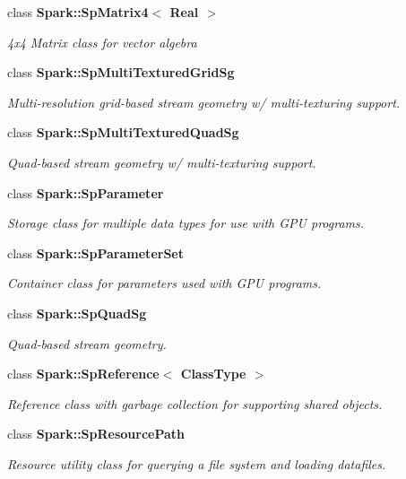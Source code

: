 \begin{CompactItemize}
class {\bf Spark::Sp\-Matrix4$<$ Real $>$}
\begin{CompactList}\small\item\em 4x4 Matrix class for vector algebra \item\end{CompactList}\item 
class {\bf Spark::Sp\-Multi\-Textured\-Grid\-Sg}
\begin{CompactList}\small\item\em Multi-resolution grid-based stream geometry w/ multi-texturing support. \item\end{CompactList}\item 
class {\bf Spark::Sp\-Multi\-Textured\-Quad\-Sg}
\begin{CompactList}\small\item\em Quad-based stream geometry w/ multi-texturing support. \item\end{CompactList}\item 
class {\bf Spark::Sp\-Parameter}
\begin{CompactList}\small\item\em Storage class for multiple data types for use with GPU programs. \item\end{CompactList}\item 
class {\bf Spark::Sp\-Parameter\-Set}
\begin{CompactList}\small\item\em Container class for parameters used with GPU programs. \item\end{CompactList}\item 
class {\bf Spark::Sp\-Quad\-Sg}
\begin{CompactList}\small\item\em Quad-based stream geometry. \item\end{CompactList}\item 
class {\bf Spark::Sp\-Reference$<$ Class\-Type $>$}
\begin{CompactList}\small\item\em Reference class with garbage collection for supporting shared objects. \item\end{CompactList}\item 
class {\bf Spark::Sp\-Resource\-Path}
\begin{CompactList}\small\item\em Resource utility class for querying a file system and loading datafiles. \item\end{CompactList}\item 

\end{CompactItemize}
